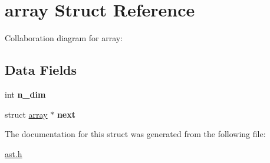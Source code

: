 \hypertarget{structarray}{}\section{array Struct Reference}
\label{structarray}


Collaboration diagram for array\+:
\subsection*{Data Fields}
\begin{DoxyCompactItemize}
\item 
\mbox{\label{structarray_acb74a0dd8ec090f9e3090a49c5f13116}} 
int {\bfseries n\+\_\+dim}
\item 
\mbox{\label{structarray_a77ca1924870bc0f629a49ae5d6a0d3bc}} 
struct \hyperlink{structarray}{array} $\ast$ {\bfseries next}
\end{DoxyCompactItemize}


The documentation for this struct was generated from the following file\+:\begin{DoxyCompactItemize}
\item 
\hyperlink{ast_8h}{ast.\+h}\end{DoxyCompactItemize}
